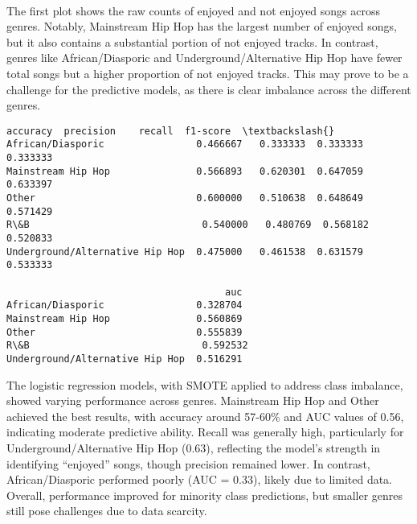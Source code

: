 \documentclass[11pt]{article}
\begin{document}
    \begin{center}
    \end{center}
    { \hspace*{\fill} \\}
    
    The first plot shows the raw counts of enjoyed and not enjoyed songs
across genres. Notably, Mainstream Hip Hop has the largest number of
enjoyed songs, but it also contains a substantial portion of not enjoyed
tracks. In contrast, genres like African/Diasporic and
Underground/Alternative Hip Hop have fewer total songs but a higher
proportion of not enjoyed tracks. This may prove to be a challenge for
the predictive models, as there is clear imbalance across the different
genres.

    
    \begin{Verbatim}[commandchars=\\\{\}]
                                 accuracy  precision    recall  f1-score  \textbackslash{}
African/Diasporic                0.466667   0.333333  0.333333  0.333333   
Mainstream Hip Hop               0.566893   0.620301  0.647059  0.633397   
Other                            0.600000   0.510638  0.648649  0.571429   
R\&B                              0.540000   0.480769  0.568182  0.520833   
Underground/Alternative Hip Hop  0.475000   0.461538  0.631579  0.533333   

                                      auc  
African/Diasporic                0.328704  
Mainstream Hip Hop               0.560869  
Other                            0.555839  
R\&B                              0.592532  
Underground/Alternative Hip Hop  0.516291  
    \end{Verbatim}

    
    The logistic regression models, with SMOTE applied to address class
imbalance, showed varying performance across genres. Mainstream Hip Hop
and Other achieved the best results, with accuracy around 57-60\% and
AUC values of 0.56, indicating moderate predictive ability. Recall was
generally high, particularly for Underground/Alternative Hip Hop (0.63),
reflecting the model's strength in identifying ``enjoyed'' songs, though
precision remained lower. In contrast, African/Diasporic performed
poorly (AUC = 0.33), likely due to limited data. Overall, performance
improved for minority class predictions, but smaller genres still pose
challenges due to data scarcity.
\end{document}
